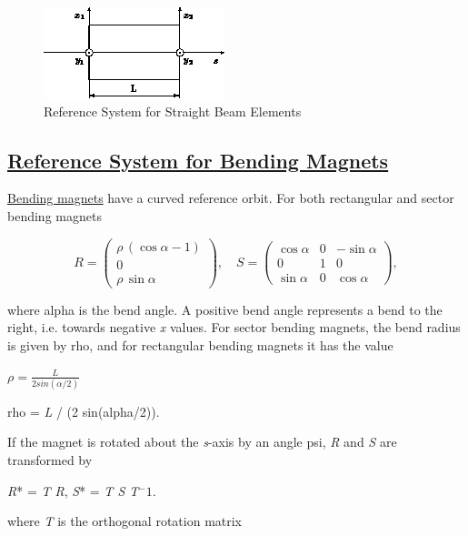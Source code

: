 \begin{figure}[H]
  \centering
	\includegraphics{figures/ref_straight.png}
  \caption{Reference System for Straight Beam Elements}
\end{figure}



\subsection{\href{rbend}{Reference System for Bending Magnets}}
\label{subsec:local_rbend}
\href{bend.html}{Bending magnets} have a curved reference orbit. For
both rectangular and sector bending magnets  


\[
R =
 \begin{pmatrix}
  \rho\,(\cos \alpha - 1) \\
  0 \\
  \rho\,\sin \alpha
 \end{pmatrix}
, \quad
S =
 \begin{pmatrix}
  \cos \alpha & 0 &  -\sin \alpha \\
  0 & 1 &  0 \\
  \sin \alpha & 0 &  \cos \alpha
 \end{pmatrix}
,
\]

where alpha is the bend angle. A positive bend angle represents a bend
to the right, i.e. towards negative \textit{x} values. For sector
bending magnets, the bend radius is given by rho, and for rectangular
bending magnets it has the value  

\( \rho = \frac{L}{2 sin(\alpha/2)} \)

 rho = \textit{L} / (2 sin(alpha/2)). 

If the magnet is rotated about the \textit{s}-axis by an angle psi,
\textit{R} and \textit{S} are transformed by  

\textit{R}* = \textit{T R}, \textit{S}* = \textit{T S T$^-1$}. 

where \textit{T} is the orthogonal rotation matrix 


